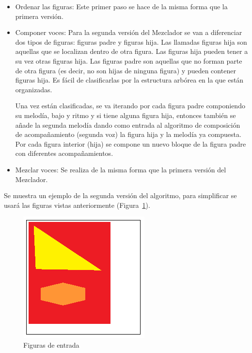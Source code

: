 \begin{itemize}
	\item Ordenar las figuras: Este primer paso se hace de la misma forma que la primera versión.

	\item Componer voces: Para la segunda versión del Mezclador se van a diferenciar dos tipos de figuras: figuras padre y figuras hija. Las llamadas figuras hija son aquellas que se localizan dentro de otra figura. Las figuras hija pueden tener a su vez otras figuras hija. Las figuras padre son aquellas que no forman parte de otra figura (es decir, no son hijas de ninguna figura) y pueden contener figuras hija. Es fácil de clasificarlas por la estructura arbórea en la que están organizadas.

Una vez están clasificadas, se va iterando por cada figura padre componiendo su melodía, bajo y ritmo y si tiene alguna figura hija, entonces también se añade la segunda melodía dando como entrada al algoritmo de composición de acompañamiento (segunda voz) la figura hija y la melodía ya compuesta. Por cada figura interior (hija) se compone un nuevo bloque de la figura padre con diferentes acompañamientos.

	\item Mezclar voces: Se realiza de la misma forma que la primera versión del Mezclador.

\end{itemize}

Se muestra un ejemplo de la segunda versión del algoritmo, para simplificar se usará las figuras vistas anteriormente (Figura~\ref{fig:Figura0Mixer}).

		\begin{figure}[!p]
		\centering
		\hspace*{0.0in}
		\includegraphics[scale=1]{graphics/simpletest5.png}
		\caption{Figuras de entrada}
		\label{fig:Figura0Mixer}
		\end{figure}


